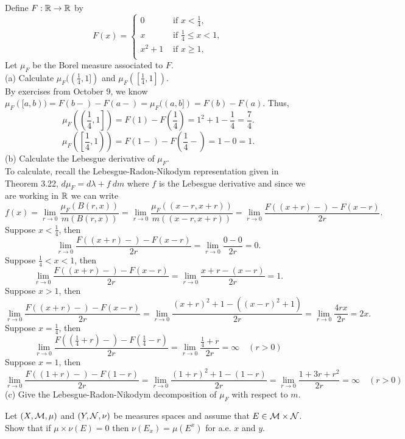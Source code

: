 \begin{list}
  \item Define $F: {\mathbb R} \rightarrow {\mathbb R}$ by 
 \[ F(x) = \left\{
 \begin{array}{ll}
	0 & \text{ if } x< \frac{1}{4},\\
	x & \text{ if } \frac{1}{4}\leq  x< 1,\\
	x^2+1 & \text{ if }  x\geq 1,\\
\end{array} \right.
 \]
 Let $\mu_F$ be the Borel measure associated to $F$.\\
 (a) Calculate $\mu_F((\frac{1}{4},1])$ and $\mu_F([\frac{1}{4},1])$.\\
 By exercises from October 9, we know $\mu_F([a,b))=F(b-)-F(a-)=\mu_F((a, b])=F(b) - F(a)$. Thus,
 \[
 \mu_F\left(\left(\frac{1}{4},1\right]\right) = F(1) - F\left( \frac{1}{4} \right) = 1^2 + 1 - \frac{1}{4} = \frac{7}{4}. 
 \]
 \[
  \mu_F\left(\left[\frac{1}{4},1\right)\right) = F(1-) - F\left( \frac{1}{4} -\right) = 1-0 = 1. 
 \]
 (b) Calculate the Lebesgue derivative of $\mu_F$. \\
 To calculate, recall the Lebesgue-Radon-Nikodym representation given in Theorem 3.22, $d \mu_F = d \lambda + f \ dm$ where $f$ is the Lebesgue derivative and since we are working in ${\mathbb R}$ we can write
 \[
 f(x) = \lim_{r \rightarrow 0} \frac{\mu_F(B(r,x))}{m(B(r,x))} = \lim_{r \rightarrow 0}\frac{\mu_F((x-r,x+r))}{m((x-r,x+r))} = \lim_{r \rightarrow 0} \frac{F((x+r)-)-F(x-r)}{2r}.
 \]
 Suppose $x < \frac{1}{4}$, then\[
 \lim_{r \rightarrow 0} \frac{F((x+r)-)-F(x-r)}{2r} = \lim_{r \rightarrow 0} \frac{0-0}{2r} =0.
 \]
  Suppose $ \frac{1}{4}< x < 1$, then\[
 \lim_{r \rightarrow 0} \frac{F((x+r)-)-F(x-r)}{2r} = \lim_{r \rightarrow 0} \frac{x+r - (x-r)}{2r} =1.
 \]
   Suppose $ x>1$, then\[
 \lim_{r \rightarrow 0} \frac{F((x+r)-)-F(x-r)}{2r} = \lim_{r \rightarrow 0} \frac{(x+r)^2 + 1 - ((x-r)^2 +1) }{2r} =\lim_{r \rightarrow 0} \frac{4rx}{2r} = 2x.
 \]
 Suppose $x = \frac{1}{4}$, then\[
 \lim_{r \rightarrow 0} \frac{F\left(\left(\frac{1}{4}+r\right)-\right)-F\left(\frac{1}{4}-r\right)}{2r} = \lim_{r \rightarrow 0} \frac{\frac{1}{4}+r}{2r} = \infty \quad (r>0)
 \]
  Suppose $x = 1$, then\[
 \lim_{r \rightarrow 0} \frac{F\left(\left(1+r\right)-\right)-F\left(1-r\right)}{2r} = \lim_{r \rightarrow 0} \frac{(1+r)^2 + 1 - (1-r)}{2r} = \lim_{r \rightarrow 0} \frac{1+3r+r^2}{2r} = \infty \quad (r>0)
 \]
 (c) Give the Lebesgue-Radon-Nikodym decomposition of $\mu_F$ with respect to $m$. 
 \item Let $(X, {\mathcal M}, \mu)$ and $(Y, {\mathcal N}, \nu)$ be measures spaces and assume that $E \in {\mathcal M} \times {\mathcal N}$. Show that if $\mu \times \nu (E)=0$ then $\nu(E_x)=\mu(E^x)$ for a.e. $x$ and $y$. 
 \begin{pf}
 	
 \end{pf}

\end{list}